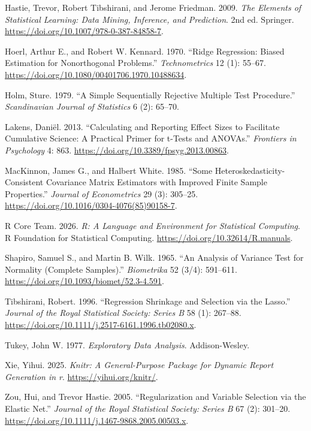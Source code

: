 \documentclass[
  10pt,
]{article}
\newlength{\cslhangindent}
\newenvironment{CSLReferences}[2] %
 {\begin{list}{}{%
  \setlength{\itemindent}{0pt}
  \setlength{\leftmargin}{0pt}
  \setlength{\parsep}{0pt}
  \ifodd #1
   \setlength{\leftmargin}{\cslhangindent}
   \setlength{\itemindent}{-1\cslhangindent}
  \fi
  \setlength{\itemsep}{#2\baselineskip}}}
 {\end{list}}
\begin{document}
\begin{CSLReferences}{1}{1}
Hastie, Trevor, Robert Tibshirani, and Jerome Friedman. 2009. \emph{The
Elements of Statistical Learning: Data Mining, Inference, and
Prediction}. 2nd ed. Springer.
\url{https://doi.org/10.1007/978-0-387-84858-7}.

Hoerl, Arthur E., and Robert W. Kennard. 1970. {``Ridge Regression:
Biased Estimation for Nonorthogonal Problems.''} \emph{Technometrics} 12
(1): 55--67. \url{https://doi.org/10.1080/00401706.1970.10488634}.

Holm, Sture. 1979. {``A Simple Sequentially Rejective Multiple Test
Procedure.''} \emph{Scandinavian Journal of Statistics} 6 (2): 65--70.

Lakens, Daniël. 2013. {``Calculating and Reporting Effect Sizes to
Facilitate Cumulative Science: A Practical Primer for t-Tests and
ANOVAs.''} \emph{Frontiers in Psychology} 4: 863.
\url{https://doi.org/10.3389/fpsyg.2013.00863}.

MacKinnon, James G., and Halbert White. 1985. {``Some
Heteroskedasticity-Consistent Covariance Matrix Estimators with Improved
Finite Sample Properties.''} \emph{Journal of Econometrics} 29 (3):
305--25. \url{https://doi.org/10.1016/0304-4076(85)90158-7}.

R Core Team. 2026. \emph{R: A Language and Environment for Statistical
Computing}. R Foundation for Statistical Computing.
\url{https://doi.org/10.32614/R.manuals}.

Shapiro, Samuel S., and Martin B. Wilk. 1965. {``An Analysis of Variance
Test for Normality (Complete Samples).''} \emph{Biometrika} 52 (3/4):
591--611. \url{https://doi.org/10.1093/biomet/52.3-4.591}.

Tibshirani, Robert. 1996. {``Regression Shrinkage and Selection via the
Lasso.''} \emph{Journal of the Royal Statistical Society: Series B} 58
(1): 267--88. \url{https://doi.org/10.1111/j.2517-6161.1996.tb02080.x}.

Tukey, John W. 1977. \emph{Exploratory Data Analysis}. Addison-Wesley.

Xie, Yihui. 2025. \emph{Knitr: A General-Purpose Package for Dynamic
Report Generation in r}. \url{https://yihui.org/knitr/}.

Zou, Hui, and Trevor Hastie. 2005. {``Regularization and Variable
Selection via the Elastic Net.''} \emph{Journal of the Royal Statistical
Society: Series B} 67 (2): 301--20.
\url{https://doi.org/10.1111/j.1467-9868.2005.00503.x}.

\end{CSLReferences}
\end{document}
